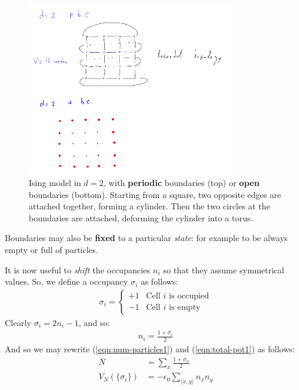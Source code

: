 \documentclass[../template.tex]{subfiles}
\begin{document}
\begin{figure}[H]
    \centering
    \includegraphics[width=0.8\textwidth]{image011.png}
    \caption{Ising model in $d=2$, with \textbf{periodic} boundaries (top) or \textbf{open} boundaries (bottom). Starting from a square, two opposite edges are attached together, forming a cylinder. Then the two circles at the boundaries are attached, deforming the cylinder into a torus.\label{fig:2dperiodic}}
\end{figure}

Boundaries may also be \textbf{fixed} to a particular \textit{state}: for example to be always empty or full of particles.

\medskip

It is now useful to \textit{shift} the occupancies $n_i$ so that they assume symmetrical values. So, we define a  occupancy $\sigma_i$ as follows:
\begin{align}\label{eqn:spins}
    \sigma_i = \begin{cases}
        +1 & \text{Cell $i$ is occupied}\\
        -1 & \text{Cell $i$ is empty}
    \end{cases}
\end{align}
Clearly $\sigma_i = 2n_i - 1$, and so:
\begin{align*}
    n_i = \frac{1 + \sigma_i}{2} 
\end{align*}
And so we may rewrite (\ref{eqn:num-particles1}) and (\ref{eqn:total-pot1}) as follows:
\begin{align} \label{eqn:num-particles}
    N &= \sum_x \frac{1 + \sigma_x}{2}\\ 
    \label{eqn:total-pot}
    V_N(\{\sigma_i\}) &= - \epsilon_0 \sum_{\langle x,y \rangle} n_x n_y
\end{align}
\end{document}
